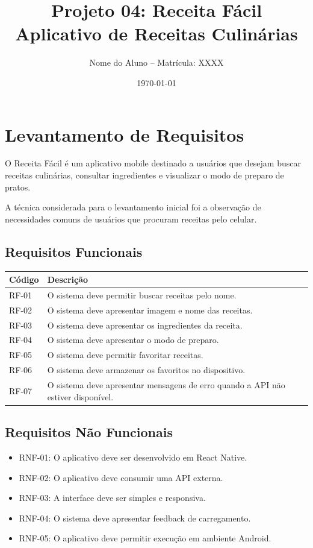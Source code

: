 \documentclass[12pt,a4paper]{article}
\title{Projeto 04: Receita Fácil\\Aplicativo de Receitas Culinárias}
\author{Nome do Aluno -- Matrícula: XXXX}
\date{\today}
\begin{document}
\maketitle
\tableofcontents
\newpage

\section{Levantamento de Requisitos}

O Receita Fácil é um aplicativo mobile destinado a usuários que desejam buscar receitas culinárias, consultar ingredientes e visualizar o modo de preparo de pratos.

A técnica considerada para o levantamento inicial foi a observação de necessidades comuns de usuários que procuram receitas pelo celular.

\subsection{Requisitos Funcionais}

\begin{longtable}{p{2cm}p{10cm}}
\toprule
Código & Descrição\\
\midrule
RF-01 & O sistema deve permitir buscar receitas pelo nome.\\
RF-02 & O sistema deve apresentar imagem e nome das receitas.\\
RF-03 & O sistema deve apresentar os ingredientes da receita.\\
RF-04 & O sistema deve apresentar o modo de preparo.\\
RF-05 & O sistema deve permitir favoritar receitas.\\
RF-06 & O sistema deve armazenar os favoritos no dispositivo.\\
RF-07 & O sistema deve apresentar mensagens de erro quando a API não estiver disponível.\\
\bottomrule
\end{longtable}

\subsection{Requisitos Não Funcionais}

\begin{itemize}
\item RNF-01: O aplicativo deve ser desenvolvido em React Native.
\item RNF-02: O aplicativo deve consumir uma API externa.
\item RNF-03: A interface deve ser simples e responsiva.
\item RNF-04: O sistema deve apresentar feedback de carregamento.
\item RNF-05: O aplicativo deve permitir execução em ambiente Android.
\end{itemize}
\end{document}

